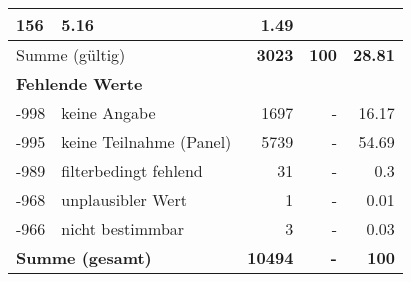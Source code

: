 \begin{longtable}{lXrrr}
       \num{156} &
       \num[round-mode=places,round-precision=2]{5.16} &
         \num[round-mode=places,round-precision=2]{1.49} \\
     \midrule
     \multicolumn{2}{l}{Summe (gültig)} &
       \textbf{\num{3023}} &
     \textbf{\num{100}} &
       \textbf{\num[round-mode=places,round-precision=2]{28.81}} \\
     \multicolumn{5}{l}{\textbf{Fehlende Werte}}\\
       -998 &
       keine Angabe &
         \num{1697} &
        - &
         \num[round-mode=places,round-precision=2]{16.17} \\
       -995 &
       keine Teilnahme (Panel) &
         \num{5739} &
        - &
         \num[round-mode=places,round-precision=2]{54.69} \\
       -989 &
       filterbedingt fehlend &
         \num{31} &
        - &
         \num[round-mode=places,round-precision=2]{0.3} \\
       -968 &
       unplausibler Wert &
         \num{1} &
        - &
         \num[round-mode=places,round-precision=2]{0.01} \\
       -966 &
       nicht bestimmbar &
         \num{3} &
        - &
         \num[round-mode=places,round-precision=2]{0.03} \\
     \midrule
     \multicolumn{2}{l}{\textbf{Summe (gesamt)}} &
          \textbf{\num{10494}} &
        \textbf{-} &
        \textbf{\num{100}} \\
     \bottomrule
     \end{longtable}
     
